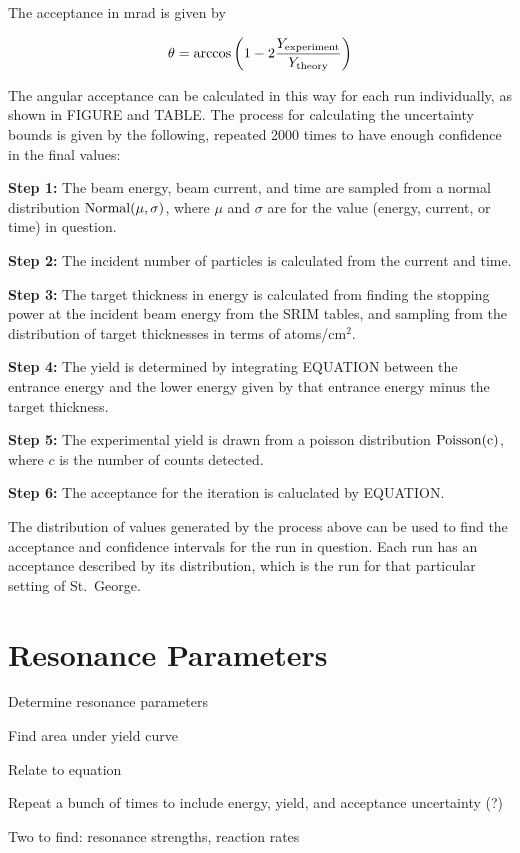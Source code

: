 The acceptance in mrad is given by

\begin{equation}
    \theta = \arccos\left(1 - 2 \frac{Y_{\rm experiment}}{Y_{\rm theory}}\right)
\end{equation}

The angular acceptance can be calculated in this way for each run
individually, as shown in FIGURE and TABLE. The process for
calculating the uncertainty bounds is given by the following, repeated
2000 times to have enough confidence in the final values:

\textbf{Step 1:}
  The beam energy, beam current, and time are sampled from a normal
  distribution $\rm{Normal}(\mu,\sigma)$, where $\mu$ and $\sigma$ are for the value
  (energy, current, or time) in question.

\textbf{Step 2:}
  The incident number of particles is calculated from the current and
  time.

\textbf{Step 3:}
  The target thickness in energy is calculated from finding the stopping
  power at the incident beam energy from the SRIM tables, and sampling
  from the distribution of target thicknesses in terms of atoms/cm${}^{2}$.

\textbf{Step 4:}
  The yield is determined by integrating EQUATION between the
  entrance energy and the lower energy given by that entrance energy
  minus the target thickness.

\textbf{Step 5:}
  The experimental yield is drawn from a poisson distribution
  $\rm{Poisson}(c)$, where $c$ is the number of counts detected.

\textbf{Step 6:}
  The acceptance for the iteration is caluclated by EQUATION.

The distribution of values generated by the process above can be used to
find the acceptance and confidence intervals for the run in question.
Each run has an acceptance described by its distribution, which is the
run for that particular setting of St.\ George.


\section{Resonance Parameters}

Determine resonance parameters

Find area under yield curve

Relate to equation

Repeat a bunch of times to include energy, yield, and acceptance uncertainty (?)

Two to find: resonance strengths, reaction rates
